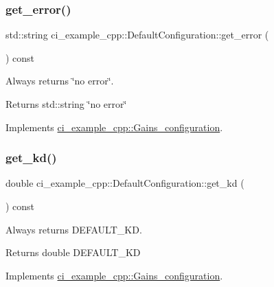 \subsubsection{\texorpdfstring{get\+\_\+error()}{get\_error()}}
{\footnotesize\ttfamily std\+::string ci\+\_\+example\+\_\+cpp\+::\+Default\+Configuration\+::get\+\_\+error (\begin{DoxyParamCaption}{ }\end{DoxyParamCaption}) const\hspace{0.3cm}{\ttfamily [virtual]}}



Always returns \char`\"{}no error\char`\"{}. 

\begin{DoxyReturn}{Returns}
std\+::string \char`\"{}no error\char`\"{} 
\end{DoxyReturn}


Implements \hyperlink{classci__example__cpp_1_1Gains__configuration_a886100ef46082d1b9f8ee169318dc554}{ci\+\_\+example\+\_\+cpp\+::\+Gains\+\_\+configuration}.

\mbox{\label{classci__example__cpp_1_1DefaultConfiguration_a5eee0c350de525150b04c81a72cd5932}} 
\subsubsection{\texorpdfstring{get\+\_\+kd()}{get\_kd()}}
{\footnotesize\ttfamily double ci\+\_\+example\+\_\+cpp\+::\+Default\+Configuration\+::get\+\_\+kd (\begin{DoxyParamCaption}{ }\end{DoxyParamCaption}) const\hspace{0.3cm}{\ttfamily [virtual]}}



Always returns D\+E\+F\+A\+U\+L\+T\+\_\+\+KD. 

\begin{DoxyReturn}{Returns}
double D\+E\+F\+A\+U\+L\+T\+\_\+\+KD 
\end{DoxyReturn}


Implements \hyperlink{classci__example__cpp_1_1Gains__configuration_a4bc25c0a8283f36366b888feaf15efa9}{ci\+\_\+example\+\_\+cpp\+::\+Gains\+\_\+configuration}.

